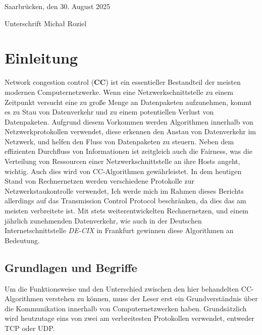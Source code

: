 \documentclass[paper=a4,fontsize=12pt,ngerman]{scrartcl}
\begin{document}
Saarbrücken, den 30. August 2025

\bigskip
\bigskip
\bigskip



Unterschrift  Micha\l{} Roziel




\clearpage
\tableofcontents 

\clearpage
{}



\section{Einleitung}

Network congestion control (\textbf{CC}) ist ein essentieller Bestandteil der 
meisten modernen Computernetzwerke. 
Wenn eine Netzwerkschnittstelle zu einem Zeitpunkt versucht eine zu große Menge an Datenpaketen aufzunehmen,
kommt es zu Stau von Datenverkehr und zu einem potentiellen Verlust von Datenpaketen.
Aufgrund diesem Vorkommen werden Algorithmen innerhalb von Netzwerkprotokollen verwendet, diese erkennen den Anstau von Datenverkehr im Netzwerk,
und helfen den Fluss von Datenpaketen zu steuern. Neben dem effizienten Durchfluss von Informationen ist zeitgleich auch die Fairness, 
was die Verteilung von Ressourcen einer Netzwerkschnittstelle an ihre Hosts angeht, wichtig. Auch dies wird von CC-Algorithmen gewährleistet.
In dem heutigen Stand von Rechnernetzen werden verschiedene Protokolle zur Netzwerkstaukontrolle verwendet, 
Ich werde mich im Rahmen dieses Berichts allerdings auf das Transmission Control Protocol beschränken, da dies das am meisten verbreitete ist.  \newline
\newline
Mit stets weiterentwickelten Rechnernetzen, und einem jährlich zunehmenden Datenverkehr, wie auch in der Deutschen Internetschnittstelle
\textit{DE-CIX}\cite{DE-CIX2025} in Frankfurt gewinnen diese Algorithmen an Bedeutung. 






\subsection{Grundlagen und Begriffe}
Um die Funktionsweise und den Unterschied zwischen den hier behandelten CC-Algorithmen verstehen zu können, muss der Leser erst ein Grundverständnis über die Kommunikation innerhalb von Computernetzwerken haben.
Grundsätzlich wird heutzutage eins von zwei am verbreitesten Protokollen verwendet, entweder 
TCP oder UDP. 
\end{document}
